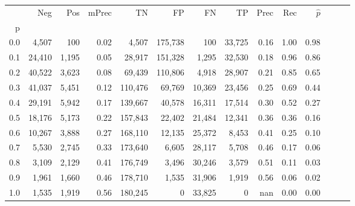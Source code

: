 \begin{tabular}{rrrrrrrrrrrrrr}
\toprule
{} &     Neg &    Pos & mPrec &       TN &       FP &      FN &      TP &  Prec &   Rec & $\hat{p}$ \\
p   &         &        &       &          &          &         &         &       &       &           \\
\midrule
0.0 &   4,507 &    100 &  0.02 &    4,507 &  175,738 &     100 &  33,725 &  0.16 &  1.00 &      0.98 \\
0.1 &  24,410 &  1,195 &  0.05 &   28,917 &  151,328 &   1,295 &  32,530 &  0.18 &  0.96 &      0.86 \\
0.2 &  40,522 &  3,623 &  0.08 &   69,439 &  110,806 &   4,918 &  28,907 &  0.21 &  0.85 &      0.65 \\
0.3 &  41,037 &  5,451 &  0.12 &  110,476 &   69,769 &  10,369 &  23,456 &  0.25 &  0.69 &      0.44 \\
0.4 &  29,191 &  5,942 &  0.17 &  139,667 &   40,578 &  16,311 &  17,514 &  0.30 &  0.52 &      0.27 \\
0.5 &  18,176 &  5,173 &  0.22 &  157,843 &   22,402 &  21,484 &  12,341 &  0.36 &  0.36 &      0.16 \\
0.6 &  10,267 &  3,888 &  0.27 &  168,110 &   12,135 &  25,372 &   8,453 &  0.41 &  0.25 &      0.10 \\
0.7 &   5,530 &  2,745 &  0.33 &  173,640 &    6,605 &  28,117 &   5,708 &  0.46 &  0.17 &      0.06 \\
0.8 &   3,109 &  2,129 &  0.41 &  176,749 &    3,496 &  30,246 &   3,579 &  0.51 &  0.11 &      0.03 \\
0.9 &   1,961 &  1,660 &  0.46 &  178,710 &    1,535 &  31,906 &   1,919 &  0.56 &  0.06 &      0.02 \\
1.0 &   1,535 &  1,919 &  0.56 &  180,245 &        0 &  33,825 &       0 &   nan &  0.00 &      0.00 \\
\bottomrule
\end{tabular}
